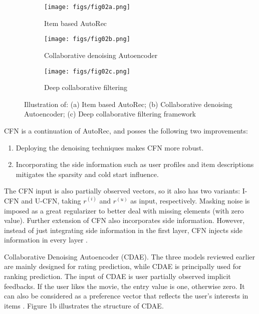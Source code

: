 \documentclass[a4paper,fleqn]{cas-dc}
\begin{document}
\begin{figure}

	\begin{subfigure}{.5\textwidth}
		\centering
		\texttt{[image: figs/fig02a.png]}
		\caption{Item based AutoRec}
		\label{FIG:02:a}
	\end{subfigure}

	\begin{subfigure}{.5\textwidth}
		\centering
		\texttt{[image: figs/fig02b.png]}
		\caption{Collaborative denoising Autoencoder}
		\label{FIG:02:b}
	\end{subfigure}

	\begin{subfigure}{.5\textwidth}
		\centering
		\texttt{[image: figs/fig02c.png]}
		\caption{Deep collaborative filtering}
		\label{FIG:02:c}
	\end{subfigure}

	\caption{Illustration of: (a) Item based AutoRec; (b) Collaborative denoising Autoencoder; (c) Deep collaborative filtering framework \citep{29zhang2019a}}
	\label{FIG:02}
\end{figure}

CFN \citep{30strub2016a, 26strub2015a} is a continuation of AutoRec, and posses the following two improvements:

\begin{enumerate}
	\item Deploying the denoising techniques makes CFN more robust.
	\item Incorporating the side information such as user profiles and item descriptions mitigates the sparsity and cold start influence.
\end{enumerate}

The CFN input is also partially observed vectors, so it also has two variants: I-CFN and U-CFN, taking $r^{(i)}$ and $r^{(u)}$ as input, respectively. Masking noise is imposed as a great regularizer to better deal with missing elements (with zero value). Further extension of CFN also incorporates side information. However, instead of just integrating side information in the first layer, CFN injects side information in every layer \citep{29zhang2019a}.

Collaborative Denoising Autoencoder (CDAE). The three models reviewed earlier are mainly designed for rating prediction, while CDAE \citep{28wu2016a} is principally used for ranking prediction. The input of CDAE is user partially observed implicit feedbacks. If the user likes the movie, the entry value is one, otherwise zero. It can also be considered as a preference vector that reflects the user's interests in items \citep{29zhang2019a}. Figure 1b illustrates the structure of CDAE.
\end{document}
